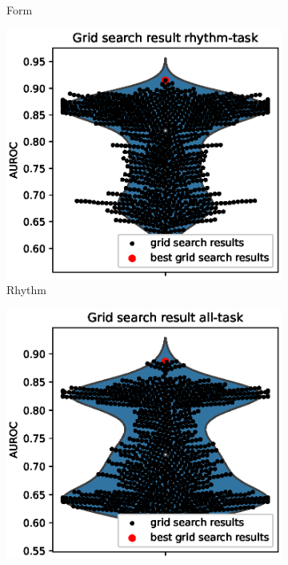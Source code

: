 \begin{figure}[hp]
\begin{subfigure}[b]{0.45\textwidth}
        \caption{Form}
        \label{fig:gridsearch_form}
     \end{subfigure}
          \hfill
      \begin{subfigure}[b]{0.45\textwidth}
        \includegraphics[width=1.0\textwidth]{images/violinrhythm.eps}
        \caption{Rhythm}
        \label{fig:gridsearch_rhythm}
     \end{subfigure}
     \hfill
     \begin{subfigure}[b]{0.45\textwidth}
        \includegraphics[width=1.0\textwidth]{images/violinall.eps}

\end{subfigure}
\end{figure}
